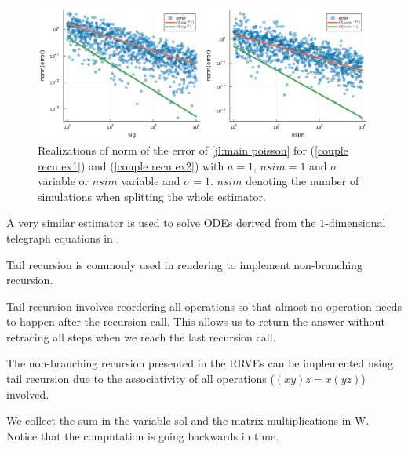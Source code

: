 \documentclass[a4paper,12pt]{article}
\begin{document}
\begin{figure}[h!]
  \centering
  \includegraphics[width=\textwidth]{julia_plots/main_poisson_convergence.pdf}
  \caption{Realizations of norm of the error of \ref{jl:main poisson} for (\ref{couple recu ex1}) and (\ref{couple recu ex2}) with $a=1$,
    $nsim =1$ and $\sigma$ variable or $nsim$ variable and $\sigma = 1$. $nsim$ denoting the number of simulations
    when splitting the whole estimator.}
  \label{fig:main poisson convergence}
\end{figure}

\begin{related}
  A very similar estimator is used to solve ODEs derived from the
  $1$-dimensional telegraph equations in \cite{acebron_monte_2016}.
\end{related}

Tail recursion is commonly used in rendering to implement non-branching recursion.

\begin{technique}
  Tail recursion involves reordering all operations
  so that almost no operation needs to happen after
  the recursion call. This allows us to return the
  answer without retracing all steps when we reach
  the last recursion call.
\end{technique}

The non-branching recursion presented in the RRVEs can
be implemented using tail recursion due to the associativity
of all operations ($(xy)z = x(yz)$) involved.

\begin{julia}
  We collect the sum in the variable sol and the matrix multiplications in W.
  Notice that the computation is going backwards in time.

\end{julia}
\end{document}
